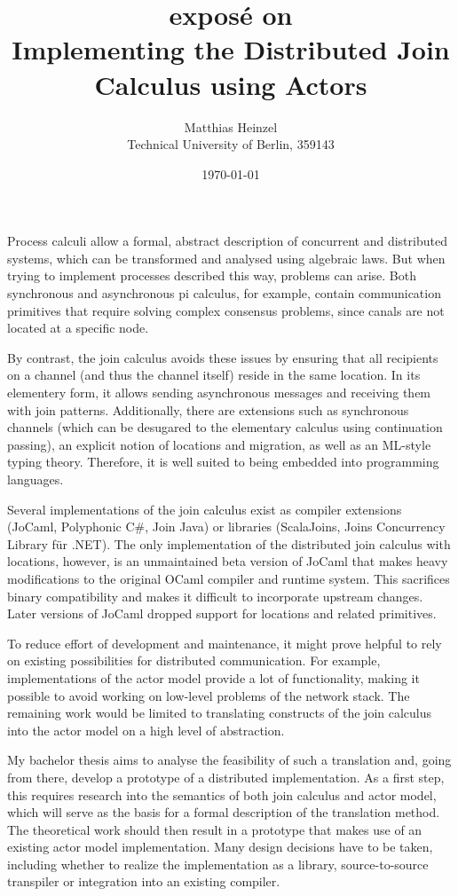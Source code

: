 \documentclass[12pt]{article}
\title{
  {\large expos\'e on} \\
  Implementing the Distributed Join Calculus using Actors
}
\author{Matthias Heinzel\\Technical University of Berlin, 359143}
\date{\today}
\begin{document}
\maketitle

Process calculi allow a formal, abstract description of concurrent and distributed systems, which can be transformed and analysed using algebraic laws.
But when trying to implement processes described this way, problems can arise.
Both synchronous and asynchronous pi calculus, for example, contain communication primitives that require solving complex consensus problems, since canals are not located at a specific node.

By contrast, the join calculus avoids these issues by ensuring that all recipients on a channel (and thus the channel itself) reside in the same location\cite{fournet_reflexive_1996}.
In its elementery form, it allows sending asynchronous messages and receiving them with join patterns.
Additionally, there are extensions such as synchronous channels (which can be desugared to the elementary calculus using continuation passing), an explicit notion of locations and migration\cite{fournet_calculus_1996}, as well as an ML-style typing theory\cite{fournet_implicit_1997}. Therefore, it is well suited to being embedded into programming languages.

Several implementations of the join calculus exist as compiler extensions (JoCaml\cite{mandel_programming_2007}, Polyphonic C\#\cite{benton_modern_2002}, Join Java\cite{itzstein_implementing_2003}) or libraries (ScalaJoins\cite{haller_implementing_2008}, Joins Concurrency Library für .NET\cite{russo_joins_2007}).
The only implementation of the distributed join calculus with locations, however, is an unmaintained beta version of JoCaml that makes heavy modifications to the original OCaml compiler and runtime system\cite{conchon_jocaml:_1999}.
This sacrifices binary compatibility and makes it difficult to incorporate upstream changes. Later versions of JoCaml dropped support for locations and related primitives.

To reduce effort of development and maintenance, it might prove helpful to rely on existing possibilities for distributed communication. For example, implementations of the actor model provide a lot of functionality, making it possible to avoid working on low-level problems of the network stack.
The remaining work would be limited to translating constructs of the join calculus into the actor model on a high level of abstraction.

My bachelor thesis aims to analyse the feasibility of such a translation and, going from there, develop a prototype of a distributed implementation.
As a first step, this requires research into the semantics of both join calculus and actor model, which will serve as the basis for a formal description of the translation method.
The theoretical work should then result in a prototype that makes use of an existing actor model implementation.
Many design decisions have to be taken, including whether to realize the implementation as a library, source-to-source transpiler or integration into an existing compiler.
\end{document}
